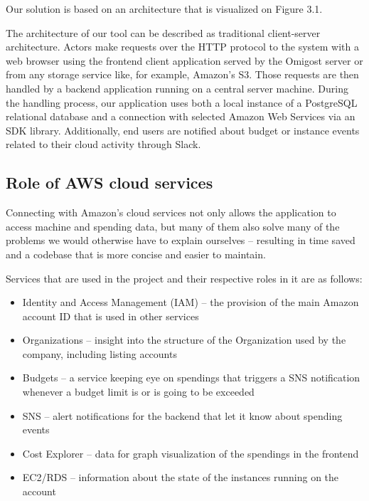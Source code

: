 \documentclass[licencjacka,en]{thesisclass}
\begin{document}
    Our solution is based on an architecture that is visualized on Figure 3.1.

    The architecture of our tool can be described as traditional client-server architecture.
    Actors make requests over the HTTP protocol to the system with a web browser
    using the frontend client application
    served by the Omigost server or from any storage
    service like, for example, Amazon's S3.
    Those requests are then handled by a backend application running on a central server machine.
    During the handling process, our application uses both a local instance
    of a PostgreSQL relational database
    and a connection with selected Amazon Web Services via an SDK library.
    Additionally, end users are notified about budget or instance events
    related to their cloud activity through Slack.

    \subsection{Role of AWS cloud services}
    Connecting with Amazon's cloud services not only allows the application
    to access machine and spending data,
    but many of them also solve many of the problems we would otherwise have
    to explain ourselves -- resulting
    in time saved and a codebase that is more concise and easier to maintain.

    Services that are used in the project and their respective roles in it are as follows:
    \begin{itemize}
        \item Identity and Access Management (IAM) -- the provision of the main
          Amazon account ID that is used in other services
        \item Organizations -- insight into the structure of the Organization
          used by the company, including listing accounts
        \item Budgets -- a service keeping eye on spendings that triggers
          a SNS notification whenever a budget limit is or is going to be exceeded
        \item SNS -- alert notifications for the backend that let it know about spending events
        \item Cost Explorer -- data for graph visualization of the spendings in the frontend
        \item EC2/RDS -- information about the state of the instances running on the account
    \end{itemize}
\end{document}
